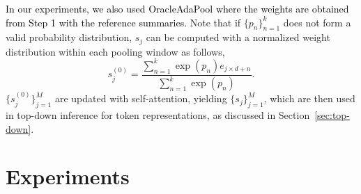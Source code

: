 \textcolor{black}{In our experiments, we also used OracleAdaPool where the weights are obtained from Step 1 with the reference summaries.}
Note that if $\{p_n\}_{n=1}^k$ does not form a valid probability distribution, $s_j$ can be computed with a normalized weight distribution within each pooling window as follows,
\begin{equation}
    s_j^{(0)} = \frac{\sum_{n=1}^k \exp(p_n) e_{j \times d + n}}{\sum_{n=1}^k \exp(p_n)}.
\end{equation}
$\{s_j^{(0)}\}_{j=1}^M$ are updated with self-attention, yielding $\{s_j\}_{j=1}^M$, which are then used in top-down inference for token representations, as discussed in Section~\ref{sec:top-down}. 

\section{Experiments}

